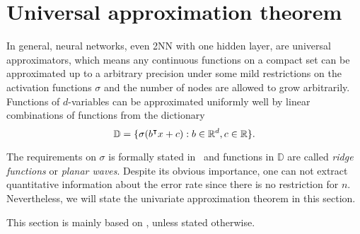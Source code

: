 
\section{Universal approximation theorem}
\label{sec:uat}

In general, neural networks, even 2NN with one hidden layer, are universal
approximators, which means any continuous functions on a compact set can be
approximated up to a arbitrary precision under some mild restrictions on the
activation functions $\sigma$ and the number of nodes are allowed to grow
arbitrarily. Functions of $d$-variables can be approximated uniformly well by
linear combinations of functions from the dictionary
\begin{equation}
    \label{eq:uat_dict}
    \mathbb{D} = \{\sigma(b{}^{\intercal} x + c): b \in \mathbb{R}^d, c\in \mathbb{R} \}.
\end{equation}

The requirements on $\sigma$ is formally stated
in~\cite{cybenkoApproximationSuperpositionsSigmoidal1989} and functions in
$\mathbb{D}$ are called \textit{ridge functions} or \textit{planar waves}.
Despite its obvious importance, one can not extract quantitative information
about the error rate since there is no restriction for $n$. Nevertheless, we
will state the univariate approximation theorem in this section. 

This section is mainly based on
\cite{cybenkoApproximationSuperpositionsSigmoidal1989}, unless stated otherwise.


